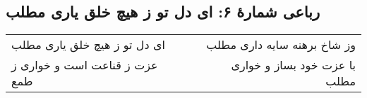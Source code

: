 \begin{center}
\section*{رباعی شمارهٔ ۶:  ای دل تو ز هیچ خلق یاری مطلب}
\label{sec:006}
\begin{longtable}{l p{0.5cm} r}
 ای دل تو ز هیچ خلق یاری مطلب
&&
وز شاخ برهنه سایه داری مطلب
\\
عزت ز قناعت است و خواری ز طمع
&&
با عزت خود بساز و خواری مطلب
\\
\end{longtable}
\end{center}
